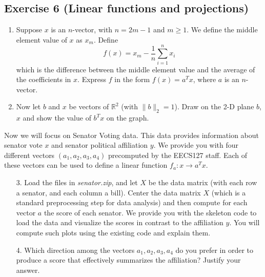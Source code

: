 \documentclass[11pt]{article}
\begin{document}
\begin{solution}
\end{solution}

\newpage
\subsection*{Exercise 6 (Linear functions and projections)}

\begin{enumerate}
    \item Suppose $x$ is an $n$-vector, with $n = 2m - 1$ and $m \geq 1$. We define the middle element value of $x$ as $x_m$. Define $$f(x) = x_m - \frac{1}{n}\sum_{i = 1}^n x_i$$ which is the difference between the middle element value and the average of the coefficients in $x$. Express $f$ in the form $f(x) = a^Tx$, where $a$ is an $n$-vector.

    \item Now let $b$ and $x$ be vectors of $\mathbb{R}^2$ (with $\|b\|_2 = 1$). Draw on the 2-D plane $b$, $x$ and show the value of $b^Tx$ on the graph.
\end{enumerate}

Now we will focus on Senator Voting data. This data provides information about senator vote $x$ and senator political affiliation $y$. We provide you with four different vectors $(a_1, a_2, a_3, a_4)$ precomputed by the EECS127 staff. Each of these vectors can be used to define a linear function $f_a: x \rightarrow a^Tx$.

\begin{enumerate}
    \item[3.] Load the files in \textit{senator.zip}, and let $X$ be the data matrix (with each row a senator, and each column a bill). Center the data matrix $X$ (which is a standard preprocessing step for data analysis) and then compute for each vector $a$ the score of each senator. We provide you with the skeleton code to load the data and visualize the scores in contrast to the affiliation $y$. You will compute such plots using the existing code and explain them.

    \item[4.] Which direction among the vectors $a_1, a_2, a_3, a_4$ do you prefer in order to produce a score that effectively summarizes the affiliation? Justify your answer.
\end{enumerate}

\begin{solution}
\end{solution}
\end{document}
